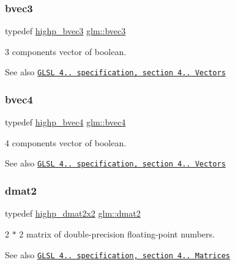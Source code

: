 \subsubsection{\texorpdfstring{bvec3}{bvec3}}
{\footnotesize\ttfamily typedef \hyperlink{group__core__precision_gac35c0ff5b9eead09e905b4aa09d1e954}{highp\+\_\+bvec3} \hyperlink{group__core__types_ga3f07d6d37fc6fe875170fd5799685bcf}{glm\+::bvec3}}

3 components vector of boolean.

\begin{DoxySeeAlso}{See also}
\href{http://www.opengl.org/registry/doc/GLSLangSpec.4.20.8.pdf}{\tt G\+L\+SL 4.. specification, section 4.. Vectors} 
\end{DoxySeeAlso}
\mbox{\label{group__core__types_ga6bb211b3d3bebae3867548d5673ca5cd}} 
\subsubsection{\texorpdfstring{bvec4}{bvec4}}
{\footnotesize\ttfamily typedef \hyperlink{group__core__precision_ga12155cf93fb8fea5d9c4c7e2d72aed4e}{highp\+\_\+bvec4} \hyperlink{group__core__types_ga6bb211b3d3bebae3867548d5673ca5cd}{glm\+::bvec4}}

4 components vector of boolean.

\begin{DoxySeeAlso}{See also}
\href{http://www.opengl.org/registry/doc/GLSLangSpec.4.20.8.pdf}{\tt G\+L\+SL 4.. specification, section 4.. Vectors} 
\end{DoxySeeAlso}
\mbox{\label{group__core__types_gad8c130d26c4cd9a1a831c1a74292a8f6}} 
\subsubsection{\texorpdfstring{dmat2}{dmat2}}
{\footnotesize\ttfamily typedef \hyperlink{group__core__precision_gaf0445ee32625d26bf79bb84e3d5a5502}{highp\+\_\+dmat2x2} \hyperlink{group__core__types_gad8c130d26c4cd9a1a831c1a74292a8f6}{glm\+::dmat2}}

2 $\ast$ 2 matrix of double-\/precision floating-\/point numbers.

\begin{DoxySeeAlso}{See also}
\href{http://www.opengl.org/registry/doc/GLSLangSpec.4.20.8.pdf}{\tt G\+L\+SL 4.. specification, section 4.. Matrices} 
\end{DoxySeeAlso}
\mbox{\label{group__core__types_gae9932771e11a4f38e21f1136423bab18}} 
